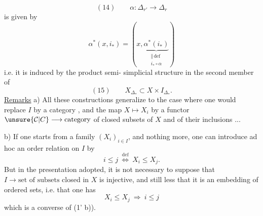 \[
(14)\qquad\alpha:\Delta_{r'}\longrightarrow\Delta_r
\]
is given by
\[
\alpha^*(x,i_*)=(x,\underbrace{\alpha^*(i_*)}_{\substack{\Vert\,\mathrm{def}\\i_*\circ\alpha}})
\]
i.e. it is induced by the product semi-
simplicial structure in the second member of
\[
(15)\qquad X_{\Delta_*}\subset X\times I_{\Delta_*}.
\]
\uline{Remarks} a) All these constructions generalize to the
case where one would replace  $I$ by a category , and
the map $X\mapsto X_i$ by a functor $\unsure{\mathcal{C}|C}\longrightarrow\text{category}$
of closed subsets of $X$ and of their inclusions
...

b) If one starts from a family $(X_i)_{i\in I}$,  and nothing
more, one can introduce ad hoc an order
relation on $I$ by 
\[
i\leq j\ \overset{\mathrm{def}}{\Longleftrightarrow}\ X_i\leq X_j.
\]
But in the presentation adopted, it is not
necessary to suppose that  $I\longrightarrow\text{set of subsets}$
closed in $X$ is injective, and still less
that it is an embedding of ordered sets,
i.e. that one has
\[
X_i\leq X_j\ \Longrightarrow\ i\leq j
\]
which is a converse of (1' b)).
